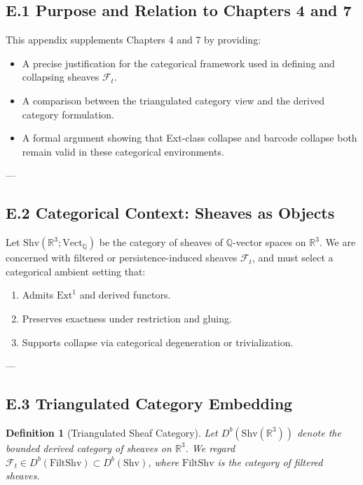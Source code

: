 \documentclass[11pt]{article}
\newtheorem{definition}[theorem]{Definition}
\begin{document}
\subsection*{E.1 Purpose and Relation to Chapters 4 and 7}

This appendix supplements Chapters 4 and 7 by providing:

\begin{itemize}
  \item A precise justification for the categorical framework used in defining and collapsing sheaves \( \mathcal{F}_t \).
  \item A comparison between the triangulated category view and the derived category formulation.
  \item A formal argument showing that Ext-class collapse and barcode collapse both remain valid in these categorical environments.
\end{itemize}

---

\subsection*{E.2 Categorical Context: Sheaves as Objects}

Let \( \mathrm{Shv}(\mathbb{R}^3; \mathrm{Vect}_\mathbb{Q}) \) be the category of sheaves of \( \mathbb{Q} \)-vector spaces on \( \mathbb{R}^3 \).  
We are concerned with filtered or persistence-induced sheaves \( \mathcal{F}_t \), and must select a categorical ambient setting that:

\begin{enumerate}
  \item Admits \( \mathrm{Ext}^1 \) and derived functors.
  \item Preserves exactness under restriction and gluing.
  \item Supports collapse via categorical degeneration or trivialization.
\end{enumerate}

---

\subsection*{E.3 Triangulated Category Embedding}

\begin{definition}[Triangulated Sheaf Category]
Let \( D^b(\mathrm{Shv}(\mathbb{R}^3)) \) denote the bounded derived category of sheaves on \( \mathbb{R}^3 \).  
We regard \( \mathcal{F}_t \in D^b(\mathrm{FiltShv}) \subset D^b(\mathrm{Shv}) \),  
where \( \mathrm{FiltShv} \) is the category of filtered sheaves.
\end{definition}
\end{document}
